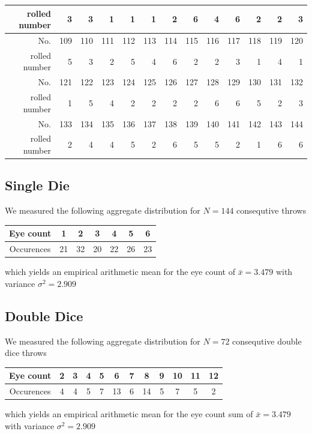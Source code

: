 \documentclass{scrreprt}
\begin{document}
\begin{table}[H]
\begin{tabular}{r||rrrrrrrrrrrr}
    rolled number & 3     & 3     & 1     & 1     & 1     & 2     & 6     & 4     & 6     & 2     & 2     & 3 \\ \hline
    No.   & 109   & 110   & 111   & 112   & 113   & 114   & 115   & 116   & 117   & 118   & 119   & 120 \\
    rolled number & 5     & 3     & 2     & 5     & 4     & 6     & 2     & 2     & 3     & 1     & 4     & 1 \\ \hline
    No.   & 121   & 122   & 123   & 124   & 125   & 126   & 127   & 128   & 129   & 130   & 131   & 132 \\
    rolled number & 1     & 5     & 4     & 2     & 2     & 2     & 2     & 6     & 6     & 5     & 2     & 3 \\ \hline
    No.   & 133   & 134   & 135   & 136   & 137   & 138   & 139   & 140   & 141   & 142   & 143   & 144 \\
    rolled number & 2     & 4     & 4     & 5     & 2     & 6     & 5     & 5     & 2     & 1     & 6     & 6 \\ \hline
    \end{tabular}%
\end{table}%

\subsection{Single Die}
We measured the following aggregate distribution for $N=144$ consequtive throws

\begin{center}
    \begin{tabular}{|c|cccccc|}
    \hline
    Eye count & 1 & 2 & 3 & 4 & 5 & 6\\
    \hline
    Occurences & 21 & 32 & 20 & 22 & 26 & 23\\
    \hline
    \end{tabular}
\end{center}
which yields an empirical arithmetic mean for the eye count of $\bar{x} = 3.479$ with variance $\sigma^2 = 2.909$

\subsection{Double Dice}
We measured the following aggregate distribution for $N=72$ consequtive double dice throws
\begin{center}
    \begin{tabular}{|c|ccccccccccc|}
    \hline
    Eye count & 2 & 3 & 4 & 5 & 6 & 7 & 8 & 9 & 10 & 11 & 12\\
    \hline
    Occurences & 4 & 4 & 5 & 7 & 13 & 6 & 14 & 5 & 7 & 5 & 2\\
    \hline
    \end{tabular}
\end{center}
which yields an empirical arithmetic mean for the eye count sum of $\bar{x} = 3.479$ with variance $\sigma^2 = 2.909$
\end{document}
